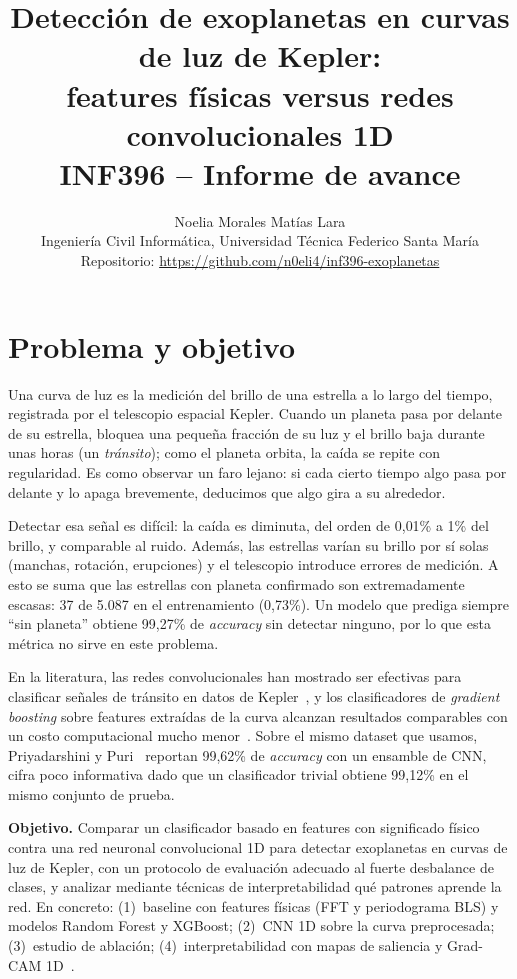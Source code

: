 \documentclass[11pt,a4paper]{article}
\title{\vspace{-1.2cm}\textbf{Detección de exoplanetas en curvas de luz de Kepler:\\
features físicas versus redes convolucionales 1D}\\[2pt]
\large INF396 -- Informe de avance}
\author{Noelia Morales \quad Matías Lara\\
\small Ingeniería Civil Informática, Universidad Técnica Federico Santa María\\
\small Repositorio: \url{https://github.com/n0eli4/inf396-exoplanetas}}
\date{\vspace{-0.6cm}}
\begin{document}
\maketitle

\section{Problema y objetivo}

Una curva de luz es la medición del brillo de una estrella a lo largo del
tiempo, registrada por el telescopio espacial Kepler. Cuando un planeta pasa por
delante de su estrella, bloquea una pequeña fracción de su luz y el brillo baja
durante unas horas (un \emph{tránsito}); como el planeta orbita, la caída se
repite con regularidad. Es como observar un faro lejano: si cada cierto tiempo
algo pasa por delante y lo apaga brevemente, deducimos que algo gira a su
alrededor.

Detectar esa señal es difícil: la caída es diminuta, del orden de 0{,}01\% a
1\% del brillo, y comparable al ruido. Además, las estrellas varían su brillo
por sí solas (manchas, rotación, erupciones) y el telescopio introduce errores
de medición. A esto se suma que las estrellas con planeta confirmado son
extremadamente escasas: 37 de 5.087 en el entrenamiento (0{,}73\%). Un modelo
que prediga siempre ``sin planeta'' obtiene 99{,}27\% de \emph{accuracy} sin
detectar ninguno, por lo que esta métrica no sirve en este problema.

En la literatura, las redes convolucionales han mostrado ser efectivas para
clasificar señales de tránsito en datos de Kepler~\cite{shallue2018,ansdell2018},
y los clasificadores de \emph{gradient boosting} sobre features extraídas de la
curva alcanzan resultados comparables con un costo computacional mucho
menor~\cite{malik2022}. Sobre el mismo dataset que usamos, Priyadarshini y
Puri~\cite{priyadarshini2021} reportan 99{,}62\% de \emph{accuracy} con un
ensamble de CNN, cifra poco informativa dado que un clasificador trivial obtiene
99{,}12\% en el mismo conjunto de prueba.

\textbf{Objetivo.} Comparar un clasificador basado en features con significado
físico contra una red neuronal convolucional 1D para detectar exoplanetas en
curvas de luz de Kepler, con un protocolo de evaluación adecuado al fuerte
desbalance de clases, y analizar mediante técnicas de interpretabilidad qué
patrones aprende la red. En concreto: (1)~baseline con features físicas (FFT y
periodograma BLS) y modelos Random Forest y XGBoost; (2)~CNN 1D sobre la curva
preprocesada; (3)~estudio de ablación; (4)~interpretabilidad con mapas de
saliencia y Grad-CAM 1D~\cite{selvaraju2017}.
\end{document}
